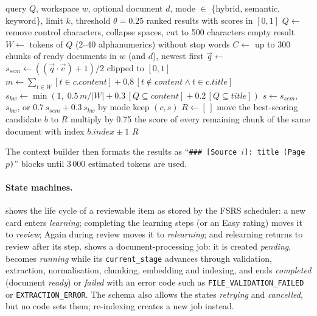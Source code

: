 \begin{algorithm}[htbp]
\caption{Hybrid retrieval scoring with neighbour suppression}\label{alg:retrieval}
\begin{algorithmic}[1]
\Require query $Q$, workspace $w$, optional document $d$, mode $\in$ \{hybrid, semantic, keyword\}, limit $k$, threshold $\theta=0.25$
\Ensure ranked results with scores in $[0,1]$
\State $Q \gets$ remove control characters, collapse spaces, cut to 500 characters
  \State \Return empty result
\EndIf
\State $W \gets$ tokens of $Q$ (2--40 alphanumerics) without stop words
\State $C \gets$ up to 300 chunks of ready documents in $w$ (and $d$), newest first
  \State $\vec{q} \gets$  
\EndIf
{}
  \State $s_{sem} \gets ((\vec{q}\cdot\vec{c}) + 1)/2$ clipped to $[0,1]$ 
  \State $m \gets \sum_{t\in W} [t \in c.\textit{content}] + 0.8\,[t \notin content \wedge t \in c.\textit{title}]$
  \State $s_{kw} \gets \min(1,\; 0.5\,m/|W| + 0.3\,[Q \subseteq content] + 0.2\,[Q \subseteq title])$
  \State $s \gets s_{sem}$, $s_{kw}$, or $0.7\,s_{sem} + 0.3\,s_{kw}$ by mode
    \State keep $(c, s)$
  \EndIf
\EndFor
\State $R \gets [\,]$
  \State move the best-scoring candidate $b$ to $R$
  \State multiply by 0.75 the score of every remaining chunk of the same document with index $b.\textit{index}\pm1$
\EndWhile
\State \Return $R$
\end{algorithmic}
\end{algorithm}

The context builder then formats the results as ``\texttt{\#\#\# [Source $i$]: title
(Page $p$)}'' blocks until 3\,000 estimated tokens are used.

\paragraph{State machines.}
 shows the life cycle of a reviewable item as stored by the
FSRS scheduler: a new card enters \emph{learning}; completing the learning steps (or
an Easy rating) moves it to \emph{review}; Again during review moves it to
\emph{relearning}; and relearning returns to review after its step.  shows a document-processing job: it is created
\emph{pending}, becomes \emph{running} while its \texttt{current\_stage} advances through
validation, extraction, normalisation, chunking, embedding and indexing, and ends
\emph{completed} (document \emph{ready}) or \emph{failed} with an error code such as
\texttt{FILE\_VALIDATION\_FAILED} or \texttt{EXTRACTION\_ERROR}. The schema also allows
the states \emph{retrying} and \emph{cancelled}, but no code sets them; re-indexing
creates a new job instead.


